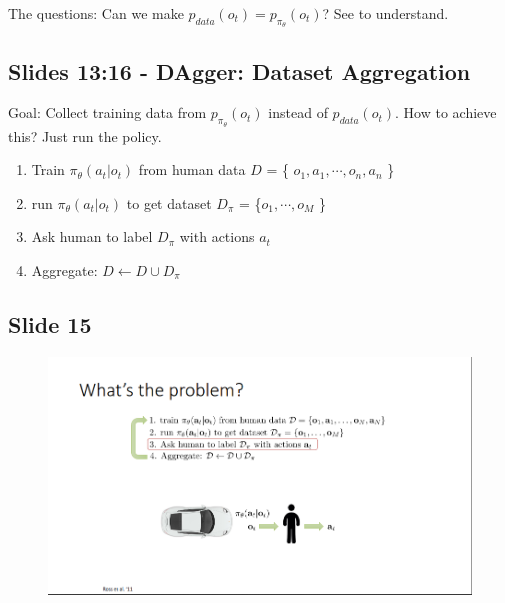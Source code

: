 \documentclass[]{article}
\begin{document}
\par The questions: Can we make $ p_{data}(o_{t}) = p_{\pi_{\theta}}(o_{t})$? See  to
understand.

\subsection*{Slides 13:16 - DAgger: Dataset Aggregation}%
\label{sub:Slides 13:16 - DAgger: Dataset Aggregation}

\par Goal: Collect training data from $p_{\pi_{\theta}}(o_{t})$  instead of $p_{data}(o_{t})$. How to achieve this?
Just run the policy.

\begin{enumerate}
    \item Train $\pi_{\theta}(a_{t}|o_{t})$  from human data $D $ = \{ $o_{1}, a_{1}, \cdots, o_{n}, a_{n}$ \}
    \item run $\pi_{\theta}(a_{t}|o_{t})$ to get dataset $D_{\pi}$ = \{$o_{1}, \cdots, o_{M}$ \}
    \item Ask human to label $D_{\pi}$ with actions $a_{t}$
    \item Aggregate: $ D \leftarrow D \cup D_{\pi}$
\end{enumerate}

\subsection*{Slide 15}%
\label{sub:Slide 15}

\begin{figure}
\begin{center}
    \includegraphics[scale=0.4]{cap2img/slide15.png}
\end{center}
\caption{}
\label{fig:problem_dagger}
\end{figure}
\end{document}
